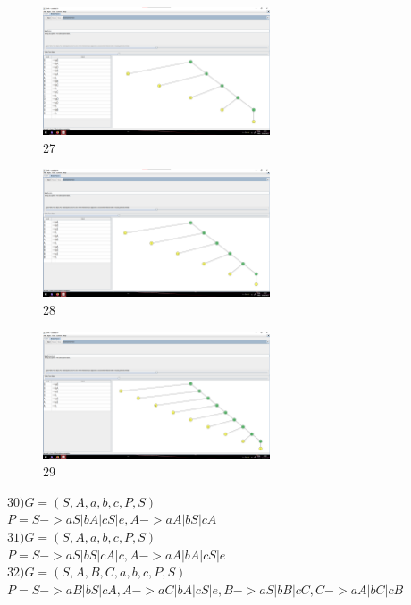 \documentclass[a4paper,12pt]{article}
\begin{document}
    \begin{figure}[H]
        \centering
        \includegraphics[width=0.6\textwidth]{Aula03/Abigail/27.png}
        \caption*{27}
    \end{figure}
    \begin{figure}[H]
        \centering
        \includegraphics[width=0.6\textwidth]{Aula03/Abigail/28.png}
        \caption*{28}
    \end{figure}
    \begin{figure}[H]
        \centering
        \includegraphics[width=0.6\textwidth]{Aula03/Abigail/29.png}
        \caption*{29}
    \end{figure}

    $30) G = ({S,A}, {a,b,c}, P, S)$ \\
    $P = { S-> aS | bA | cS | e,
    A -> aA | bS | cA
    }$ \\

    $31) G = ({S,A}, {a,b,c}, P, S)$ \\
    $P = { S-> aS | bS | cA | c,
    A -> aA | bA | cS | e
    }$ \\

    $32) G = ({S,A,B,C}, {a,b,c}, P, S)$ \\
    $P = { 
    S -> aB | bS | cA,
    A -> aC | bA | cS | e,
    B -> aS | bB | cC,
    C -> aA | bC | cB
    }$ \\
\end{document}
